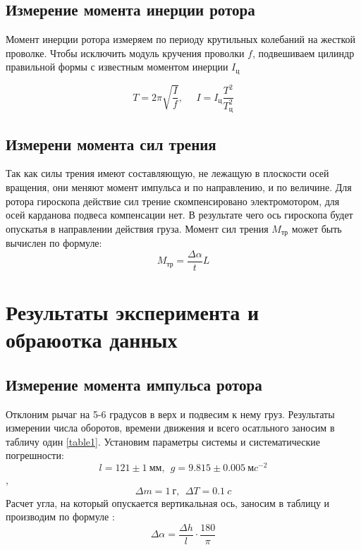 \documentclass[a4paper,12pt]{article} %
\begin{document}
\subsection{Измерение момента инерции ротора}

Момент инерции ротора измеряем по периоду крутильных колебаний на жесткой проволке.
Чтобы исключить модуль кручения проволки $f$, подвешиваем цилиндр правильной формы с известным моментом инерции $I_{ц}$

\begin{equation}
    T=2\pi\sqrt{\frac{I}{f}},\ \  \ \ \ \  I=I_\text{ц}\frac{T^2}{T^2_\text{ц}}
    \label{T}
\end{equation}

\subsection{Измерени момента сил трения}

Так как силы трения имеют составляющую, не лежащую в плоскости осей вращения,
они меняют момент импульса и по направлению, и по величине. Для ротора гироскопа
действие сил трение скомпенсировано электромотором, для осей карданова подвеса компенсации
нет. В результате чего ось гироскопа будет опускатья в направлении действия груза.
Момент сил трения $M_\text{тр}$ может быть вычислен по формуле:
\begin{equation}
    M_\text{тр}=\frac{\Delta\alpha}{t}L
\end{equation}

\section{Результаты эксперимента и обраюотка данных}
\subsection{Измерение момента импульса ротора}
Отклоним рычаг на 5-6 градусов в верх и подвесим к нему груз. Результаты измерении числа оборотов,
времени движения и всего осатльного заносим в  табличу один \ref{table1}. Установим параметры системы
и систематические погрешности:$$l=121\pm 1 \ \text{мм}, \ \ g=9.815 \pm 0.005 \ \text{м}c^{-2}$$,
$$\Delta m=1 \ \text{г},\ \ \Delta T = 0.1 \ c  $$
Расчет угла, на который опускается вертикальная ось, заносим в таблицу и производим по формуле : 
$$\Delta\alpha=\frac{\Delta h}{l} \cdot \frac{180}{\pi}  $$
\end{document}

